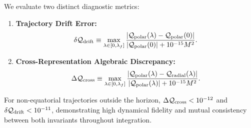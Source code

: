 We evaluate two distinct diagnostic metrics:
\begin{enumerate}
    \item \textbf{Trajectory Drift Error:}
    \begin{equation}
        \delta\mathcal{Q}_{\rm drift} \equiv \max_{\lambda \in [0, \lambda_f]} \frac{|\mathcal{Q}_{\rm polar}(\lambda) - \mathcal{Q}_{\rm polar}(0)|}{|\mathcal{Q}_{\rm polar}(0)| + 10^{-15}M^2}.
        \label{eq:carter_drift_metric}
    \end{equation}
    \item \textbf{Cross-Representation Algebraic Discrepancy:}
    \begin{equation}
        \Delta\mathcal{Q}_{\rm cross} \equiv \max_{\lambda \in [0, \lambda_f]} \frac{|\mathcal{Q}_{\rm polar}(\lambda) - \mathcal{Q}_{\rm radial}(\lambda)|}{|\mathcal{Q}_{\rm polar}(\lambda)| + 10^{-15}M^2}.
        \label{eq:carter_cross_metric}
    \end{equation}
\end{enumerate}
For non-equatorial trajectories outside the horizon, $\Delta\mathcal{Q}_{\rm cross} < 10^{-12}$ and $\delta\mathcal{Q}_{\rm drift} < 10^{-11}$, demonstrating high dynamical fidelity and mutual consistency between both invariants throughout integration.
